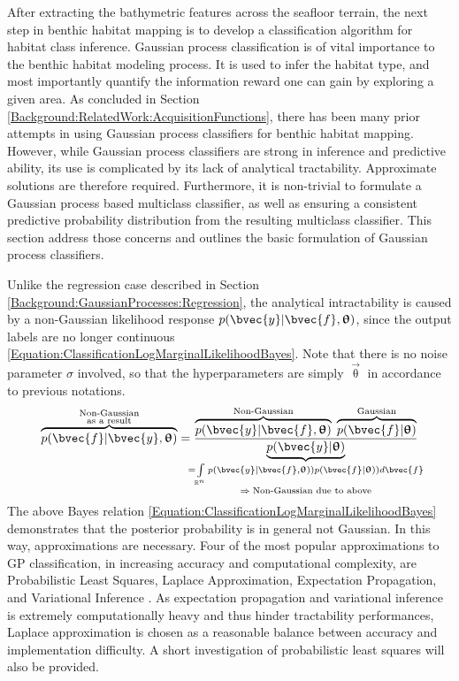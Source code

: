 		After extracting the bathymetric features across the seafloor terrain, the next step in benthic habitat mapping is to develop a classification algorithm for habitat class inference. Gaussian process classification is of vital importance to the benthic habitat modeling process. It is used to infer the habitat type, and most importantly quantify the information reward one can gain by exploring a given area. As concluded in Section \ref{Background:RelatedWork:AcquisitionFunctions}, there has been many prior attempts in using Gaussian process classifiers for benthic habitat mapping. However, while Gaussian process classifiers are strong in inference and predictive ability, its use is complicated by its lack of analytical tractability. Approximate solutions are therefore required. Furthermore, it is non-trivial to formulate a Gaussian process based multiclass classifier, as well as ensuring a consistent predictive probability distribution from the resulting multiclass classifier. This section address those concerns and outlines the basic formulation of Gaussian process classifiers.
		
		Unlike the regression case described in Section \ref{Background:GaussianProcesses:Regression}, the analytical intractability is caused by a non-Gaussian likelihood response $p(\bvec{y} | \bvec{f}, \vec{\uptheta})$, since the output labels are no longer continuous \eqref{Equation:ClassificationLogMarginalLikelihoodBayes}. Note that there is no noise parameter $\sigma$ involved, so that the hyperparameters are simply $\vec{\uptheta}$ in accordance to previous notations. \begin{equation}
			\overbrace{p(\bvec{f} | \bvec{y}, \vec{\uptheta})}^{\mathclap{\substack{\text{Non-Gaussian} \\ \text{as a result}}}} = \frac{\overbrace{p(\bvec{y} | \bvec{f}, \vec{\uptheta})}^{\text{Non-Gaussian}} \; \overbrace{p(\bvec{f} | \vec{\uptheta})}^{\text{Gaussian}}}{\underbrace{p(\bvec{y} | \vec{\uptheta})}_{\mathclap{\substack{= \int\limits_{\mathbb{R}^{n}} p(\bvec{y} | \bvec{f}, \vec{\uptheta})) p(\bvec{f} | \vec{\uptheta})) d\bvec{f} \\ \Rightarrow \; \text{Non-Gaussian due to above}}}}}
		\label{Equation:ClassificationLogMarginalLikelihoodBayes}
		\end{equation} The above Bayes relation \eqref{Equation:ClassificationLogMarginalLikelihoodBayes} demonstrates that the posterior probability is in general not Gaussian. In this way, approximations are necessary. Four of the most popular approximations to GP classification, in increasing accuracy and computational complexity, are Probabilistic Least Squares, Laplace Approximation, Expectation Propagation, and Variational Inference \citep{GaussianProcessForMachineLearning}. As expectation propagation and variational inference is extremely computationally heavy and thus hinder tractability performances, Laplace approximation is chosen as a reasonable balance between accuracy and implementation difficulty. A short investigation of probabilistic least squares will also be provided.
		

